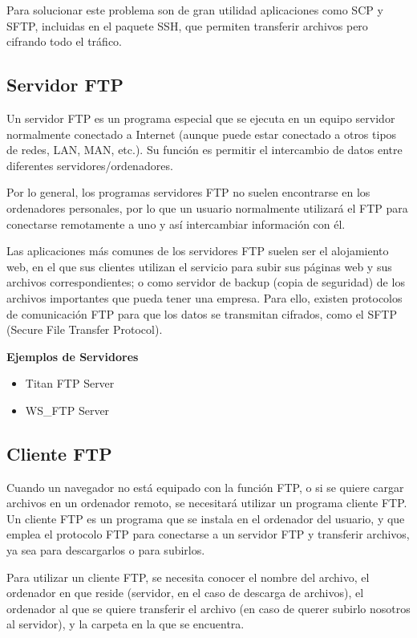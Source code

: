 \documentclass[a4paper, 12pt]{article}
\begin{document}
Para solucionar este problema son de gran utilidad aplicaciones como SCP y SFTP, incluidas en el paquete SSH, que permiten transferir archivos pero cifrando todo el tráfico.
\subsection{Servidor FTP}

Un servidor FTP es un programa especial que se ejecuta en un equipo servidor normalmente conectado a Internet (aunque puede estar conectado a otros tipos de redes, LAN, MAN, etc.). Su función es permitir el intercambio de datos entre diferentes servidores/ordenadores.

Por lo general, los programas servidores FTP no suelen encontrarse en los ordenadores personales, por lo que un usuario normalmente utilizará el FTP para conectarse remotamente a uno y así intercambiar información con él.

Las aplicaciones más comunes de los servidores FTP suelen ser el alojamiento web, en el que sus clientes utilizan el servicio para subir sus páginas web y sus archivos correspondientes; o como servidor de backup (copia de seguridad) de los archivos importantes que pueda tener una empresa. Para ello, existen protocolos de comunicación FTP para que los datos se transmitan cifrados, como el SFTP (Secure File Transfer Protocol).

\textbf{Ejemplos de Servidores}

\begin{itemize}
    \item Titan FTP Server
    \item WS\_FTP Server
\end{itemize}

\subsection{Cliente FTP}
Cuando un navegador no está equipado con la función FTP, o si se quiere cargar archivos en un ordenador remoto, se necesitará utilizar un programa cliente FTP. Un cliente FTP es un programa que se instala en el ordenador del usuario, y que emplea el protocolo FTP para conectarse a un servidor FTP y transferir archivos, ya sea para descargarlos o para subirlos.

Para utilizar un cliente FTP, se necesita conocer el nombre del archivo, el ordenador en que reside (servidor, en el caso de descarga de archivos), el ordenador al que se quiere transferir el archivo (en caso de querer subirlo nosotros al servidor), y la carpeta en la que se encuentra.
\end{document}
